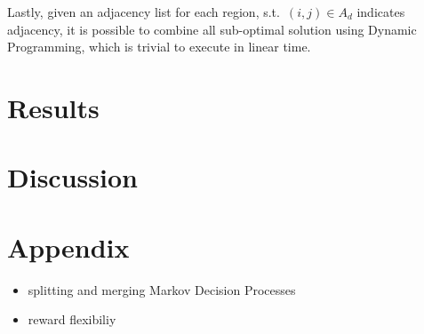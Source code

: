 \documentclass[compsoc,journal,letterpaper,10pt,draftclsnofoot,onecolumn]{IEEEtran}
\begin{document}
Lastly, given an adjacency list for each region, s.t.\ $(i,j)\in A_d$ indicates adjacency, it is possible to combine all sub-optimal solution using Dynamic Programming, which is trivial to execute in linear time.

\newpage

\section*{Results}

\vspace*{10cm}

\section*{Discussion}

\newpage

\section*{Appendix}

\begin{itemize}[label=--]
\item splitting and merging Markov Decision Processes 
  \item reward flexibiliy 
\end{itemize}
\end{document}
